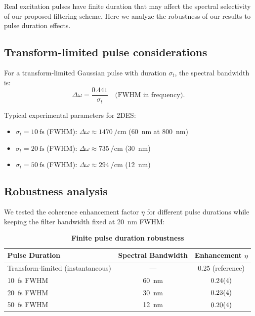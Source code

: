 \documentclass[11pt,a4paper]{article}
\begin{document}
Real excitation pulses have finite duration that may affect the spectral selectivity of our proposed filtering scheme. Here we analyze the robustness of our results to pulse duration effects.

\subsection{Transform-limited pulse considerations}

For a transform-limited Gaussian pulse with duration $\sigma_t$, the spectral bandwidth is:
\begin{equation}
\Delta\omega = \frac{0.441}{\sigma_t} \quad \text{(FWHM in frequency)}.
\label{eq:transform_limit}
\end{equation}

Typical experimental parameters for 2DES:
\begin{itemize}
    \item $\sigma_t = \SI{10}{\femto\second}$ (FWHM): $\Delta\omega \approx \SI{1470}{\per\centi\meter}$ (\SI{60}{\nano\meter} at \SI{800}{\nano\meter})
    \item $\sigma_t = \SI{20}{\femto\second}$ (FWHM): $\Delta\omega \approx \SI{735}{\per\centi\meter}$ (\SI{30}{\nano\meter})
    \item $\sigma_t = \SI{50}{\femto\second}$ (FWHM): $\Delta\omega \approx \SI{294}{\per\centi\meter}$ (\SI{12}{\nano\meter})
\end{itemize}

\subsection{Robustness analysis}

We tested the coherence enhancement factor $\eta$ for different pulse durations while keeping the filter bandwidth fixed at \SI{20}{\nano\meter} FWHM:

\begin{table}[htb]
\centering
\caption{\textbf{Finite pulse duration robustness}}
\label{tab:SI_pulse_duration}
\begin{tabular}{lcc}
\toprule
\textbf{Pulse Duration} & \textbf{Spectral Bandwidth} & \textbf{Enhancement $\eta$} \\
\midrule
Transform-limited (instantaneous) & --- & \num{0.25} (reference) \\
\SI{10}{\femto\second} FWHM & \SI{60}{\nano\meter} & $\num{0.24 \pm 0.04}$ \\
\SI{20}{\femto\second} FWHM & \SI{30}{\nano\meter} & $\num{0.23 \pm 0.04}$ \\
\SI{50}{\femto\second} FWHM & \SI{12}{\nano\meter} & $\num{0.20 \pm 0.04}$ \\
\bottomrule
\end{tabular}
\end{table}
\end{document}

